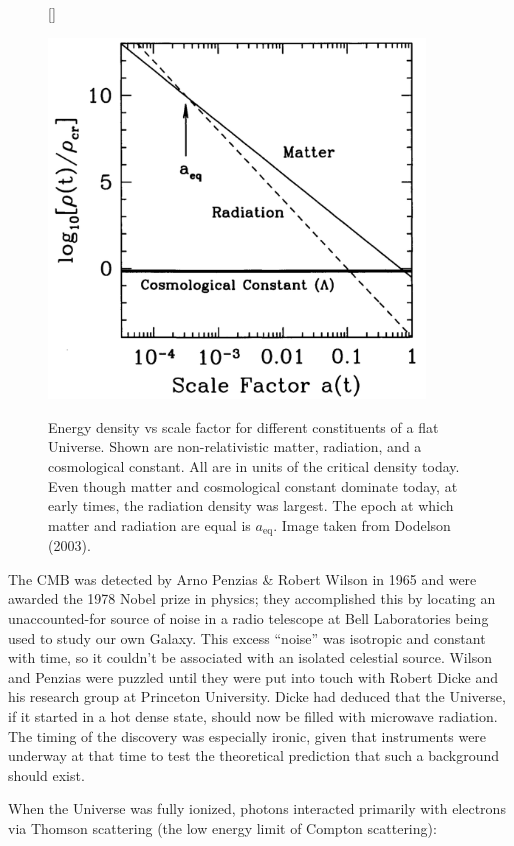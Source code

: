 \documentclass[a4paper,11pt]{article}
\begin{document}
\begin{figure}[h]
    [\FBwidth]
    {\caption{\footnotesize{Energy density vs scale factor for different constituents of a flat Universe. Shown are non-relativistic matter, radiation, and a cosmological constant. All are in units of the critical density today. Even though matter and cosmological constant dominate today, at early times, the radiation density was largest. The epoch at which matter and radiation are equal is $a_\mathrm{eq}$. Image taken from Dodelson (2003).}}
    \label{fig:energydensityscaling}}
    {\includegraphics[width=10cm]{figures/EnergyDensityScaling.png}}
\end{figure}

{\noindent}The CMB was detected by Arno Penzias \& Robert Wilson in 1965 and were awarded the 1978 Nobel prize in physics; they accomplished this by locating an unaccounted-for source of noise in a radio telescope at Bell Laboratories being used to study our own Galaxy. This excess ``noise'' was isotropic and constant with time, so it couldn't be associated with an isolated celestial source. Wilson and Penzias were puzzled until they were put into touch with Robert Dicke and his research group at Princeton University. Dicke had deduced that the Universe, if it started in a hot dense state, should now be filled with microwave radiation. The timing of the discovery was especially ironic, given that instruments were underway at that time to test the theoretical prediction that such a background should exist.

{\noindent}When the Universe was fully ionized, photons interacted primarily with electrons via Thomson scattering (the low energy limit of Compton scattering): 
\end{document}

